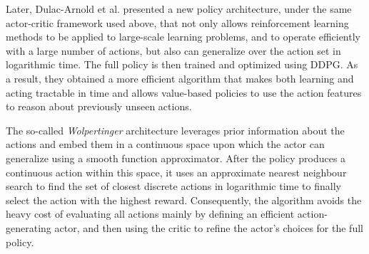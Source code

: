 Later, Dulac-Arnold et al. \cite{Dulac-Arnold2015} presented a new policy architecture, under the same actor-critic framework used above, that not only allows reinforcement learning methods to be applied to large-scale learning problems, and to operate efficiently with a large number of actions, but also can generalize over the action set in logarithmic time. The full policy is then trained and optimized using DDPG. As a result, they obtained a more efficient algorithm that makes both learning and acting tractable in time and allows value-based policies to use the action features to reason about previously unseen actions.

The so-called \textit{Wolpertinger} architecture leverages prior information about the actions and embed them in a continuous space upon which the actor can generalize using a smooth function approximator. After the policy produces a continuous action within this space, it uses an approximate nearest neighbour search to find the set of closest discrete actions in logarithmic time to finally select the action with the highest reward. Consequently, the algorithm avoids the heavy cost of evaluating all actions mainly by defining an efficient action-generating actor, and then using the critic to refine the actor's choices for the full policy.
%
%
%

